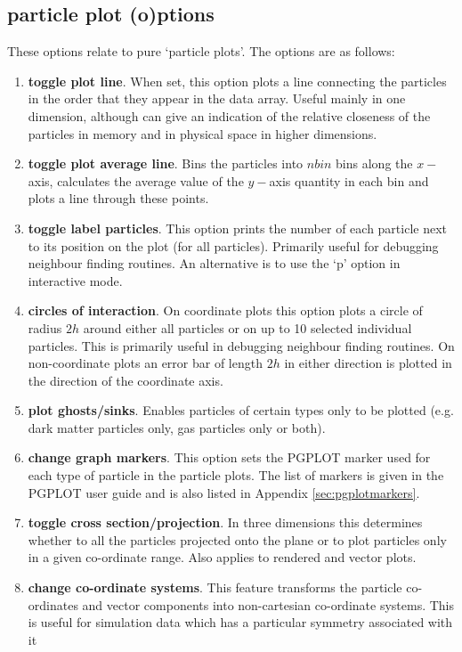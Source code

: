 \documentclass[a4paper,12pt]{article}
\begin{document}
\subsection{particle plot (o)ptions}
 These options relate to pure `particle plots'. The options are as follows:
\begin{enumerate}
\item \textbf{toggle plot line}. When set, this option plots a line connecting the particles
in the order that they appear in the data array. Useful mainly in one dimension, although can give an indication of the
relative closeness of the particles in memory and in physical space in higher dimensions.
\item \textbf{toggle plot average line}. Bins the particles into $nbin$ bins along the
$x-$axis, calculates the average value of the $y-$axis quantity in each bin and
plots a line through these points. 
\item \textbf{toggle label particles}. This option prints the number of each particle
next to its position on the plot (for all particles). Primarily useful for debugging neighbour finding
routines. An alternative is to use the `p' option in interactive mode.
\item \textbf{circles of interaction}. On coordinate plots this option plots a circle of
radius $2h$ around either all particles or on up to 10 selected individual particles. 
This is primarily useful in debugging neighbour finding routines. On
non-coordinate plots an error bar of length $2h$ in either direction is plotted
in the direction of the coordinate axis.
\item \textbf{plot ghosts/sinks}. Enables particles of certain types only to be plotted
(e.g. dark matter particles only, gas particles only or both).
\item \textbf{change graph markers}. This option sets the PGPLOT marker used for each
type of particle in the particle plots. The list of markers is given in the
PGPLOT user guide and is also listed in Appendix \ref{sec:pgplotmarkers}. 
\item \textbf{toggle cross section/projection}. In three dimensions this determines
whether to all the particles projected onto the plane or to plot particles only
in a given co-ordinate range. Also applies to rendered and vector plots.
\item \textbf{change co-ordinate systems}. This feature transforms the particle
co-ordinates and vector components into non-cartesian co-ordinate systems. This
is useful for simulation data which has a particular symmetry associated with it

\end{enumerate}
\end{document}
